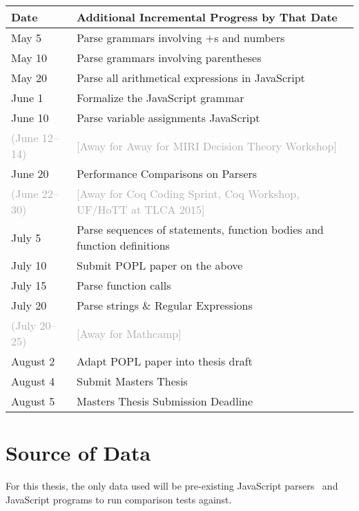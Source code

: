 \documentclass{article}
\begin{document}
  \newcommand{\away}[1]{\textcolor{darkgray}{#1}}%
  \newcommand{\awayd}[1]{\away{(#1)}}%
  \newcommand{\awayb}[1]{\away{[Away for #1]}}%
  \begin{center}
  \begin{tabular}{l|l}
  Date & Additional Incremental Progress by That Date \\ \hline
  May 5 & Parse grammars involving $+$s and numbers \\
  May 10 & Parse grammars involving parentheses \\
  May 20 & Parse all arithmetical expressions in JavaScript \\
  June 1 & Formalize the JavaScript grammar \\
  June 10 & Parse variable assignments JavaScript \\
  \awayd{June 12--14} & \awayb{Away for MIRI Decision Theory Workshop} \\
  June 20 & Performance Comparisons on Parsers \\
  \awayd{June 22--30} & \awayb{Coq Coding Sprint, Coq Workshop, UF/HoTT at TLCA 2015} \\
  July 5 & Parse sequences of statements, function bodies and function definitions \\
  July 10 & Submit POPL paper on the above \\
  July 15 & Parse function calls \\
  July 20 & Parse strings \& Regular Expressions \\
  \awayd{July 20--25} & \awayb{Mathcamp} \\
  August 2 & Adapt POPL paper into thesis draft \\
  August 4 & Submit Masters Thesis \\
  August 5 & Masters Thesis Submission Deadline
  \end{tabular}
  \end{center}

\section{Source of Data}
  For this thesis, the only data used will be pre-existing JavaScript parsers~\cite{} and JavaScript programs to run comparison tests against.\cite{}

\nocite{*}


\end{document}
